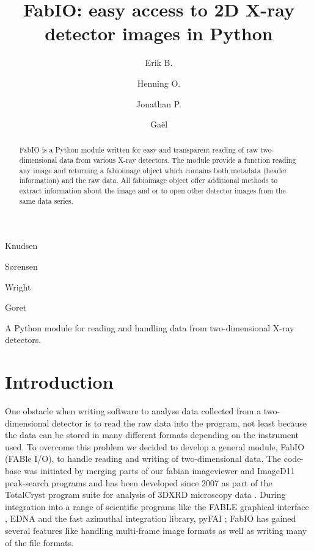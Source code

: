 \documentclass[preprint]{iucr}
\begin{document}
\title{FabIO: easy access to 2D X-ray detector images in Python}

    \author[a]{Erik B.}{Knudsen}
    \author[b]{Henning O.}{S{\o}rensen}
    \author[c]{Jonathan P.}{Wright}
    \author[c]{Ga\"el}{Goret}

\maketitle

\begin{synopsis}
A Python module for reading and handling data from two-dimensional X-ray detectors.
\end{synopsis}

\begin{abstract}
FabIO is a Python module written for easy and transparent reading 
of raw two-dimensional data from various X-ray detectors. The module provide a
function reading any image and returning a fabioimage object which 
contains both metadata (header information) and the raw data.
All fabioimage object offer additional methods to extract
information about the image and or to open other detector images from
the same data series.
 
\end{abstract}

\section{Introduction}

One obstacle when writing software to analyse data collected from a
two-dimensional detector is to read the raw data into the program,
not least because the data can be stored in many different formats
depending on the instrument used.
To overcome this problem we decided to develop a general module,
FabIO (FABle I/O), to handle reading and writing of two-dimensional
data.
The code-base was initiated by merging parts of our fabian imageviewer
\cite{fabian} and ImageD11 \cite{imaged11} peak-search programs and has
been developed since 2007 as part of the TotalCryst \cite{totalcryst}
program suite for analysis of 3DXRD microscopy data \cite{3dxrd}.
During integration into a range of scientific programs like the FABLE graphical
interface \cite{fable}, EDNA \cite{edna} and
the fast azimuthal integration library, pyFAI \cite{pyfai}; FabIO has gained
several features like handling multi-frame image formats as well as
writing many of the file formats.
\end{document}
